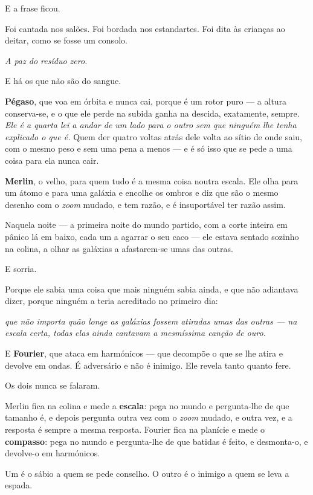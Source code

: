 \documentclass[livro.tex]{subfiles}
\begin{document}
E a frase ficou.

Foi cantada nos salões. Foi bordada nos estandartes. Foi dita às crianças ao deitar, como se fosse um consolo.

\emph{A paz do resíduo zero.}

\medskip

E há os que não são do sangue.

\textbf{Pégaso}, que voa em órbita e nunca cai, porque é um rotor puro --- a altura conserva-se, e o
que ele perde na subida ganha na descida, exatamente, sempre. \emph{Ele é a quarta lei a andar de
um lado para o outro sem que ninguém lhe tenha explicado o que é.} Quem der quatro voltas atrás
dele volta ao sítio de onde saiu, com o mesmo peso e sem uma pena a menos --- e é só isso que se
pede a uma coisa para ela nunca cair.

\textbf{Merlin}, o velho, para quem tudo é a mesma coisa noutra escala. Ele olha para um átomo e para uma galáxia e
encolhe os ombros e diz que são o mesmo desenho com o \emph{zoom} mudado, e tem razão, e é insuportável ter razão
assim.

Naquela noite --- a primeira noite do mundo partido, com a corte inteira em pânico lá em baixo, cada um a agarrar o
seu caco --- ele estava sentado sozinho na colina, a olhar as galáxias a afastarem-se umas das outras.

E sorria.

Porque ele sabia uma coisa que mais ninguém sabia ainda, e que não adiantava dizer, porque ninguém a teria
acreditado no primeiro dia:

\emph{que não importa quão longe as galáxias fossem atiradas umas das outras --- na escala certa, todas elas ainda
cantavam a mesmíssima canção de ouro.}

E \textbf{Fourier}, que ataca em harmónicos --- que decompõe o que se lhe atira e devolve em ondas. É adversário e
não é inimigo. Ele revela tanto quanto fere.

\medskip

Os dois nunca se falaram.

Merlin fica na colina e mede a \textbf{escala}: pega no mundo e pergunta-lhe de que tamanho é, e depois pergunta
outra vez com o \emph{zoom} mudado, e outra vez, e a resposta é sempre a mesma resposta. Fourier fica na planície e
mede o \textbf{compasso}: pega no mundo e pergunta-lhe de que batidas é feito, e desmonta-o, e devolve-o em
harmónicos.

Um é o sábio a quem se pede conselho. O outro é o inimigo a quem se leva a espada.
\end{document}
